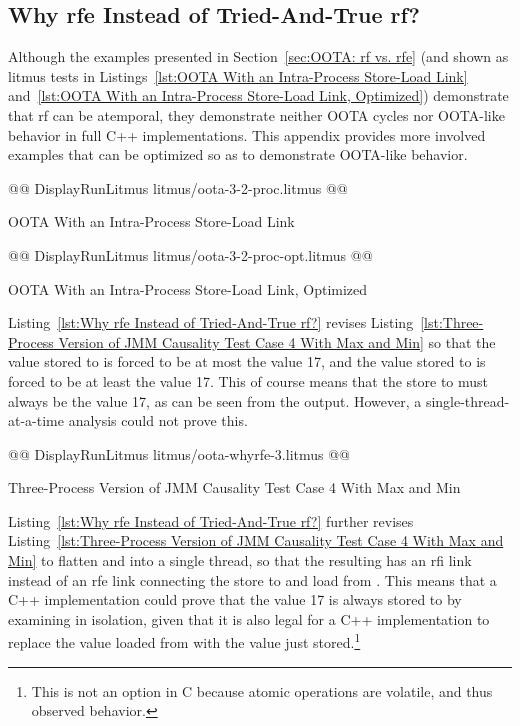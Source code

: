 \documentclass[10]{article}
\begin{document}
\subsection{Why rfe Instead of Tried-And-True rf?}
\label{app:Why rfe Instead of Tried-And-True rf?}

Although the examples presented in
Section~\ref{sec:OOTA: rf vs. rfe}
(and shown as litmus tests in
Listings~\ref{lst:OOTA With an Intra-Process Store-Load Link}
and~\ref{lst:OOTA With an Intra-Process Store-Load Link, Optimized})
demonstrate that rf can be atemporal, they demonstrate neither
OOTA cycles nor OOTA-like behavior in full C++ implementations.
This appendix provides more involved examples that can be optimized
so as to demonstrate OOTA-like behavior.

\begin{listing}[tbp]
@@ DisplayRunLitmus litmus/oota-3-2-proc.litmus @@
\caption{OOTA With an Intra-Process Store-Load Link}
\label{lst:OOTA With an Intra-Process Store-Load Link}
\end{listing}

\begin{listing}[tbp]
@@ DisplayRunLitmus litmus/oota-3-2-proc-opt.litmus @@
\caption{OOTA With an Intra-Process Store-Load Link, Optimized}
\label{lst:OOTA With an Intra-Process Store-Load Link, Optimized}
\end{listing}

Listing~\ref{lst:Why rfe Instead of Tried-And-True rf?}
revises
Listing~\ref{lst:Three-Process Version of JMM Causality Test Case 4 With Max and Min}
so that the value stored to  is forced to be at most the
value 17, and the value stored to  is forced to be at least the
value 17.
This of course means that the store to  must always be the value
17, as can be seen from the  output.
However, a single-thread-at-a-time analysis could not prove this.

\begin{listing}[tbp]
@@ DisplayRunLitmus litmus/oota-whyrfe-3.litmus @@
\caption{Three-Process Version of JMM Causality Test Case 4 With Max and Min}
\label{lst:Three-Process Version of JMM Causality Test Case 4 With Max and Min}
\end{listing}

Listing~\ref{lst:Why rfe Instead of Tried-And-True rf?}
further revises
Listing~\ref{lst:Three-Process Version of JMM Causality Test Case 4 With Max and Min}
to flatten  and  into a single thread, so that the
resulting  has an rfi link instead of an rfe link connecting
the store to and load from .
This means that a C++ implementation could prove that the value 17 is
always stored to  by examining  in isolation, given that
it is also legal for a C++ implementation to replace the value loaded
from  with the value just stored.\footnote{
	This is not an option in C because atomic operations are volatile,
	and thus observed behavior.}
\end{document}
